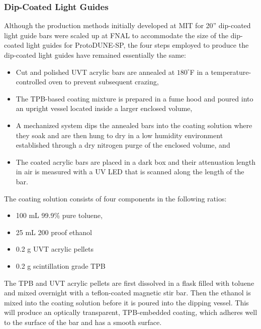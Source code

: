 \subsubsection{Dip-Coated Light Guides}
\label{ssec:fdsp-pd-pc-prod-bar1}

Although the production methods initially developed at MIT for 20'' dip-coated light guide bars were scaled up at FNAL to accommodate the size of the dip-coated light guides for ProtoDUNE-SP, the four steps employed to produce the dip-coated light guides have remained essentially the same:

\begin{itemize}
\item Cut and polished UVT acrylic bars are annealed at $180^{\circ}$F in a temperature-controlled oven to prevent subsequent crazing,
\item The TPB-based coating mixture is prepared in a fume hood and poured into an upright vessel located inside a larger enclosed volume,
\item A mechanized system dips the annealed bars into the coating solution where they soak and are then hung to dry in a low humidity environment established through a dry nitrogen purge of the enclosed volume, and
\item The coated acrylic bars are placed in a dark box and their attenuation length in air is measured with a UV LED that is scanned along the length of the bar.
\end{itemize}

The coating solution consists of four components in the following ratios:

\begin{itemize}
\item 100 mL 99.9\% pure toluene,
\item 25 mL 200 proof ethanol
\item 0.2 g UVT acrylic pellets
\item 0.2 g scintillation grade TPB
\end{itemize}

The TPB and UVT acrylic pellets are first dissolved in a flask filled with toluene and mixed overnight with a teflon-coated magnetic stir bar.  Then the ethanol is mixed into the coating solution before it is poured into the dipping vessel.  This will produce an optically transparent, TPB-embedded coating, which adheres well to the surface of the bar and has a smooth surface.

